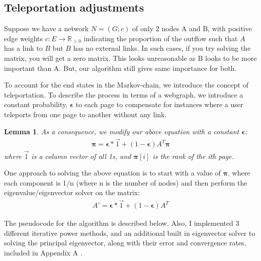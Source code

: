 \documentclass[10pt]{siamltex}
\newtheorem{mylem}{Lemma}
\begin{document}
     \subsection{Teleportation adjustments}
     Suppose we have a network $N = (G;c)$ of only 2 nodes A and B, with positive edge weights $c: E \rightarrow \mathbb{R}_{> 0}$ indicating the proportion of the outflow such that $A$ has a link to $B$ but $B$ has no external links.
     \newline
     In such cases, if you try solving the matrix, you will get a zero matrix. This looks unreasonable as B looks to be more important than A. But, our algorithm still gives same importance for both. \cite{analyticsvidhya}

To account for the end states in the Markov-chain, we introduce the concept of teleportation.  To describe the process in terms of a webgraph, we introduce a constant probability, $\boldsymbol{\epsilon}$ to each page to compensate for instances where a user teleports from one page to another without any link. \cite{analyticsvidhya}

\begin{mylem}
As a consequence, we modify our above equation with a constant $\boldsymbol{\epsilon}$:
    \begin{align}
    \boldsymbol{\pi} = \boldsymbol{\epsilon} * \vec{1} + (1 - \boldsymbol{\epsilon}) A^T \boldsymbol{\pi}
    \end{align}
    where $\vec{1}$ is a column vector of all 1s, and $\boldsymbol{\pi}[i]$ is the rank of the ith page.
\end{mylem}
\vspace{5mm}

One approach to solving the above equation is to start with a value of $\boldsymbol{\pi}$, where each component is 1/n (where n is the number of nodes) and then perform the eigenvalue/eigenvector solver on the matrix:
    \begin{align}
    A' = \boldsymbol{\epsilon} * \vec{1} + (1 - \boldsymbol{\epsilon}) A^T 
    \end{align}
    
The pseudocode for the algorithm is described below.  Also, I implemented 3 different iterative power methods, and an additional built in eigenvector solver to solving the principal eigenvector, along with their error and convergence rates, included in Appendix A \cite{eigfinder-power-methods}.
\end{document}
